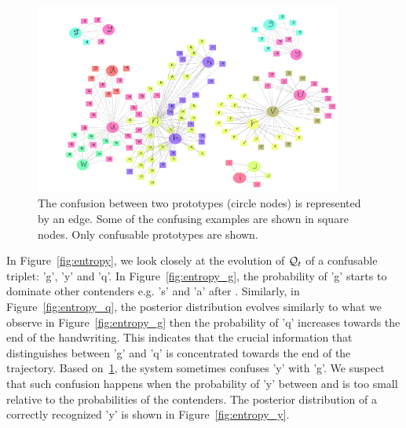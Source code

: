 \documentclass{sigchi}
\begin{document}
\begin{figure}
  \centering
  \includegraphics[width=0.9\textwidth]{figures/confusion.pdf}
  \caption{The confusion between two prototypes (circle nodes)
    is represented by an edge. Some of the confusing examples are
    shown in square nodes. Only confusable prototypes are shown. }
  \label{fig:prototypes}
\end{figure}


In Figure~\ref{fig:entropy}, we look closely at the evolution of
$\mathcal{Q}_{t}$ of a confusable triplet: 'g', 'y' and 'q'. In
Figure~\ref{fig:entropy_g}, the probability of 'g' starts to dominate
other contenders e.g. 's' and 'a' after . Similarly, in
Figure~\ref{fig:entropy_q}, the posterior distribution evolves
similarly to what we observe in Figure~\ref{fig:entropy_g} then the
probability of 'q' increases towards the end of the handwriting. This
indicates that the crucial information that distinguishes between 'g'
and 'q' is concentrated towards the end of the trajectory. Based
on~\ref{fig:prototypes}, the system sometimes confuses 'y' with 'g'. We
suspect that such confusion happens when the probability of 'y' between
 and  is too small relative to the probabilities of the
contenders. The posterior distribution of a correctly recognized 'y'
is shown in Figure~\ref{fig:entropy_y}.
\end{document}
